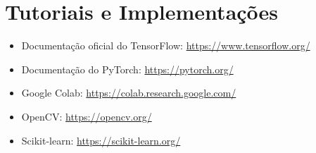 \section{Tutoriais e Implementações}

\begin{itemize}
  \item Documentação oficial do TensorFlow: \url{https://www.tensorflow.org/}
  \item Documentação do PyTorch: \url{https://pytorch.org/}
  \item Google Colab: \url{https://colab.research.google.com/}
  \item OpenCV: \url{https://opencv.org/}
  \item Scikit-learn: \url{https://scikit-learn.org/}
\end{itemize}